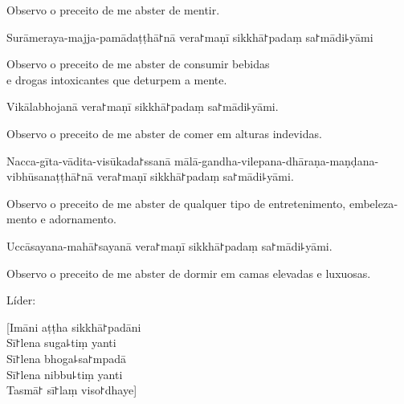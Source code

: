 \begin{english}
  Observo o preceito de me abster de mentir.
\end{english}

\clearpage

\begin{precept}
  \setcounter{enumi}{4}
  \item Surāmeraya-majja-pamādaṭṭhā꜓nā vera꜓maṇī sikkhā꜓padaṃ sa꜓mādi꜕yāmi
\end{precept}

\begin{english}
  Observo o preceito de me abster de consumir bebidas\\
  e drogas intoxicantes que deturpem a mente.
\end{english}

\begin{precept}
  \setcounter{enumi}{5}
  \item Vikālabhojanā vera꜓maṇī sikkhā꜓padaṃ sa꜓mādi꜕yāmi.
\end{precept}

\begin{english}
  Observo o preceito de me abster de comer em alturas indevidas.
\end{english}

\begin{precept}
  \setcounter{enumi}{6}
  \item Nacca-gīta-vādita-visūkada꜓ssanā mālā-gandha-vilepana-dhāraṇa-maṇḍana-vibhūsanaṭṭhā꜓nā vera꜓maṇī sikkhā꜓padaṃ sa꜓mādi꜕yāmi.
\end{precept}

\begin{english}
  Observo o preceito de me abster de qualquer tipo de entretenimento, embelezamento e adornamento.
\end{english}

\begin{precept}
  \setcounter{enumi}{7}
  \item Uccāsayana-mahā꜓sayanā vera꜓maṇī sikkhā꜓padaṃ sa꜓mādi꜕yāmi.
\end{precept}

\begin{english}
  Observo o preceito de me abster de dormir em camas elevadas e luxuosas.
\end{english}

\begin{instruction}
  Líder:
\end{instruction}

[Imāni aṭṭha sikkhā꜓padāni\\
Sī꜓lena suga꜕tiṃ yanti\\
Sī꜓lena bhoga꜕sa꜓mpadā\\
Sī꜓lena nibbu꜕tiṃ yanti\\
Tasmā꜓ sī꜓laṃ viso꜓dhaye]

